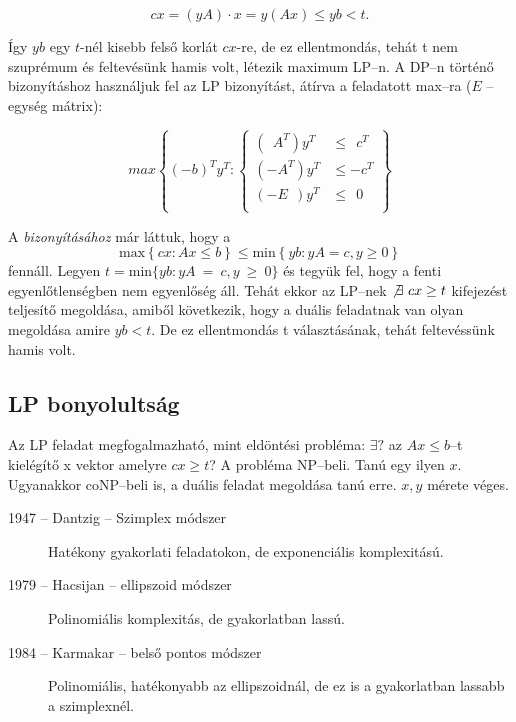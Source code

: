 \[ cx = (yA)\cdot x = y (Ax) \leq yb < t.\]

Így $yb$ egy $t$-nél kisebb felső korlát $cx$-re, de ez ellentmondás, tehát t
nem szuprémum és feltevésünk hamis volt, létezik maximum LP--n. A DP--n történő
bizonyításhoz használjuk fel az LP bizonyítást, átírva a feladatott max--ra ($E$
-- egység mátrix):

\[ max \left\{ (-b)^T y^T :
\begin{cases}
(~~A^T)y^T    &\leq~~c^T \\
(-A^T) y^T &\leq -c^T \\
(-E~~)y^T    &\leq~~0 \\
\end{cases}  \right\} \]
 
A  \emph{bizonyításához} már láttuk, hogy a \[ \mbox{max}\left\{
cx:Ax \leq b \right\} \leq
   \mbox{min}\left\{ yb:yA = c, y \geq 0 \right\}
\] fennáll. Legyen $t=\mbox{min}\{ yb:yA~=~c, y~\geq~0 \}$ és tegyük fel, hogy a
fenti egyenlőtlenségben nem egyenlőség áll.  Tehát ekkor az LP--nek
$\not\exists~cx \geq t$ kifejezést teljesítő megoldása, amiből következik,
hogy a duális feladatnak van olyan megoldása amire $yb<t$. De ez ellentmondás t
választásának, tehát feltevéssünk hamis volt.

\subsection{LP bonyolultság}

Az LP feladat megfogalmazható, mint eldöntési probléma: $\exists?$ az $Ax \leq
b$--t kielégítő x vektor amelyre $cx\geq t$? A probléma NP--beli. Tanú egy ilyen
$x$. Ugyanakkor coNP--beli is, a duális feladat megoldása tanú erre. $x, y$
mérete véges.

\begin{description}
  \item[1947 -- Dantzig -- Szimplex módszer] Hatékony gyakorlati feladatokon, de
  exponenciális komplexitású.
  \item[1979 --  Hacsijan -- ellipszoid módszer] Polinomiális komplexitás, de
  gyakorlatban lassú.
  \item[1984 --  Karmakar -- belső pontos módszer]  Polinomiális, hatékonyabb az
  ellipszoidnál, de ez is a gyakorlatban lassabb a szimplexnél.
\end{description}
